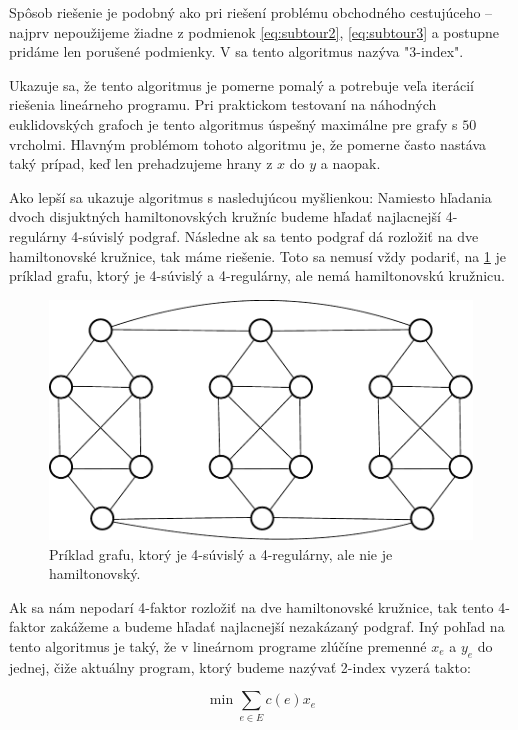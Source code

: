 Spôsob riešenie je podobný ako pri riešení problému obchodného cestujúceho -- najprv
nepoužijeme žiadne z podmienok \eqref{eq:subtour2}, \eqref{eq:subtour3} a postupne
pridáme len porušené podmienky. V \cite{duchenne} sa tento algoritmus nazýva "3-index".

Ukazuje sa, že tento algoritmus je pomerne pomalý a potrebuje veľa iterácií riešenia
lineárneho programu. Pri praktickom testovaní na náhodných euklidovských grafoch
je tento algoritmus úspešný maximálne pre grafy s $50$ vrcholmi. Hlavným problémom
tohoto algoritmu je, že pomerne často nastáva taký prípad, keď len prehadzujeme hrany z $x$ 
do $y$ a naopak. 

\smallskip

Ako lepší sa ukazuje algoritmus s nasledujúcou myšlienkou: Namiesto hľadania dvoch
disjuktných hamiltonovských kružníc budeme hľadať najlacnejší 4-regulárny 4-súvislý podgraf.
Následne ak sa tento podgraf dá rozložiť na dve hamiltonovské kružnice, tak máme riešenie.
Toto sa nemusí vždy podariť, na \ref{fig:bad} je príklad grafu, ktorý je 4-súvislý a 4-regulárny,
ale nemá hamiltonovskú kružnicu. 

\begin{figure}[h]
\centering
\includegraphics[scale=0.5]{img/bad4.pdf}
\caption{Príklad grafu, ktorý je 4-súvislý a 4-regulárny, ale nie je hamiltonovský.}
\label{fig:bad}
\end{figure}

Ak sa nám nepodarí 4-faktor rozložiť na dve hamiltonovské kružnice, tak tento 4-faktor zakážeme
a budeme hľadať najlacnejší nezakázaný podgraf.
Iný pohľad na tento algoritmus je taký, že v lineárnom programe zlúčíne premenné $x_e$ a $y_e$ 
do jednej, čiže aktuálny program, ktorý budeme nazývať 2-index vyzerá takto:

$$\min \sum_{e \in E} c(e) x_e$$ 

